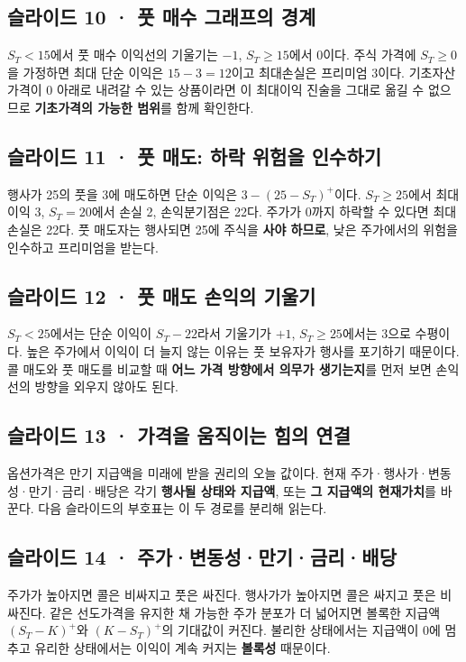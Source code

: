 \documentclass[11pt,a4paper]{article}
\begin{document}
\subsection{슬라이드 10 · 풋 매수 그래프의 경계}
$S_T<15$에서 풋 매수 이익선의 기울기는 $-1$, $S_T\geq15$에서 $0$이다. 주식 가격에 $S_T\geq0$을 가정하면 최대 단순 이익은 $15-3=12$이고 최대손실은 프리미엄 3이다. 기초자산 가격이 0 아래로 내려갈 수 있는 상품이라면 이 최대이익 진술을 그대로 옮길 수 없으므로 \textbf{기초가격의 가능한 범위}를 함께 확인한다.\par

\subsection{슬라이드 11 · 풋 매도: 하락 위험을 인수하기}
행사가 25의 풋을 3에 매도하면 단순 이익은 $3-(25-S_T)^+$이다. $S_T\geq25$에서 최대이익 3, $S_T=20$에서 손실 2, 손익분기점은 22다. 주가가 0까지 하락할 수 있다면 최대손실은 22다. 풋 매도자는 행사되면 25에 주식을 \textbf{사야 하므로}, 낮은 주가에서의 위험을 인수하고 프리미엄을 받는다.\par

\subsection{슬라이드 12 · 풋 매도 손익의 기울기}
$S_T<25$에서는 단순 이익이 $S_T-22$라서 기울기가 $+1$, $S_T\geq25$에서는 3으로 수평이다. 높은 주가에서 이익이 더 늘지 않는 이유는 풋 보유자가 행사를 포기하기 때문이다. 콜 매도와 풋 매도를 비교할 때 \textbf{어느 가격 방향에서 의무가 생기는지}를 먼저 보면 손익선의 방향을 외우지 않아도 된다.\par

\subsection{슬라이드 13 · 가격을 움직이는 힘의 연결}
옵션가격은 만기 지급액을 미래에 받을 권리의 오늘 값이다. 현재 주가·행사가·변동성·만기·금리·배당은 각기 \textbf{행사될 상태와 지급액}, 또는 \textbf{그 지급액의 현재가치}를 바꾼다. 다음 슬라이드의 부호표는 이 두 경로를 분리해 읽는다.\par

\subsection{슬라이드 14 · 주가·변동성·만기·금리·배당}
주가가 높아지면 콜은 비싸지고 풋은 싸진다. 행사가가 높아지면 콜은 싸지고 풋은 비싸진다. 같은 선도가격을 유지한 채 가능한 주가 분포가 더 넓어지면 볼록한 지급액 $(S_T-K)^+$와 $(K-S_T)^+$의 기대값이 커진다. 불리한 상태에서는 지급액이 0에 멈추고 유리한 상태에서는 이익이 계속 커지는 \textbf{볼록성} 때문이다.\par
\end{document}
